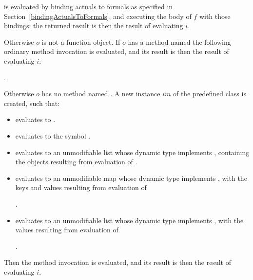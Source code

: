 \documentclass[makeidx]{article}
\begin{document}
{\noindent
{}

\noindent
is evaluated by binding actuals to formals
as specified in Section~\ref{bindingActualsToFormals},
and executing the body of $f$ with those bindings;
the returned result is then the result of evaluating $i$.

\LMHash{}%
Otherwise $o$ is not a function object.
If $o$ has a method named \CALL{}
the following ordinary method invocation is evaluated,
and its result is then the result of evaluating $i$:

\noindent
{}.

\LMHash{}%
Otherwise $o$ has no method named \CALL.
A new instance $im$ of the predefined class  is created,
such that:
\begin{itemize}
\item {} evaluates to \TRUE.
\item {} evaluates to the symbol .
\item {} evaluates to an unmodifiable list
  whose dynamic type implements ,
  containing the objects resulting from evaluation of
  .
\item {} evaluates to an unmodifiable map
  whose dynamic type implements ,
  with the keys and values resulting from evaluation of

  .
\item {} evaluates to an unmodifiable list
  whose dynamic type implements ,
  with the values resulting from evaluation of

  .
\end{itemize}

\LMHash{}%
Then the method invocation  is evaluated,
and its result is then the result of evaluating $i$.



}
\end{document}
